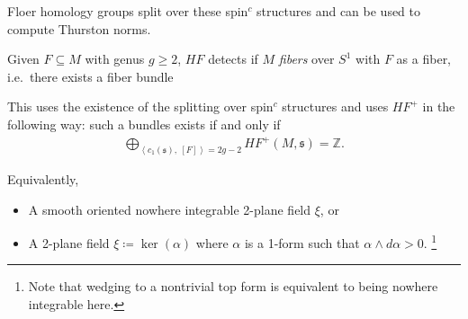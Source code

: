 \begin{slogan}

Floer homology groups split over these spin\(^c\) structures and can be
used to compute Thurston norms.

\end{slogan}

\begin{theorem}[Ni]

Given \(F \subseteq M\) with genus \(g\geq 2\), \(HF\) detects if \(M\)
\emph{fibers} over \(S^1\) with \(F\) as a fiber, i.e.~there exists a
fiber bundle

\begin{center}
\end{center}

This uses the existence of the splitting over spin\(^c\) structures and
uses \(HF^+\) in the following way: such a bundles exists if and only if
\begin{align*}
\bigoplus _{{\left\langle { c_1(\mathfrak{s}) },~{ [F] } \right\rangle}  =2g-2} HF^+(M, \mathfrak{s}) = {\mathbb{Z}}
.\end{align*}

\end{theorem}

\begin{definition}

Equivalently,

\begin{itemize}
\item
  A smooth oriented nowhere integrable 2-plane field \(\xi\), or
\item
  A 2-plane field \(\xi \coloneqq\ker( \alpha)\) where \(\alpha\) is a
  1-form such that \(\alpha\wedge d \alpha > 0\). \footnote{Note that
    wedging to a nontrivial top form is equivalent to being nowhere
    integrable here.}
\end{itemize}

\end{definition}


